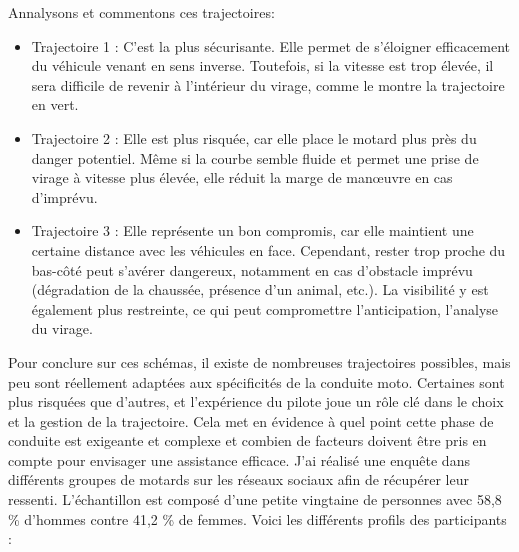 Annalysons et commentons ces trajectoires:\
\begin{itemize}
    \item Trajectoire 1 : C’est la plus sécurisante. Elle permet de s’éloigner efficacement du véhicule venant en sens inverse. Toutefois, si la vitesse est trop élevée, il sera difficile de revenir à l’intérieur du virage, comme le montre la trajectoire en vert.
    \item Trajectoire 2 : Elle est plus risquée, car elle place le motard plus près du danger potentiel. Même si la courbe semble fluide et permet une prise de virage à vitesse plus élevée, elle réduit la marge de manœuvre en cas d’imprévu.
    \item Trajectoire 3 : Elle représente un bon compromis, car elle maintient une certaine distance avec les véhicules en face. Cependant, rester trop proche du bas-côté peut s’avérer dangereux, notamment en cas d’obstacle imprévu (dégradation de la chaussée, présence d’un animal, etc.). La visibilité y est également plus restreinte, ce qui peut compromettre l’anticipation, l'analyse du virage.
\end{itemize}
Pour conclure sur ces schémas, il existe de nombreuses trajectoires possibles, mais peu sont réellement adaptées aux spécificités de la conduite moto. Certaines sont plus risquées que d’autres, et l’expérience du pilote joue un rôle clé dans le choix et la gestion de la trajectoire. Cela met en évidence à quel point cette phase de conduite est exigeante et complexe et combien de facteurs doivent être pris en compte pour envisager une assistance efficace.
J'ai réalisé une enquête dans différents groupes de motards sur les réseaux sociaux afin de récupérer leur ressenti. L'échantillon est composé d'une petite vingtaine de personnes avec 58,8 \% d'hommes contre 41,2 \% de femmes.
Voici les différents profils des participants :
